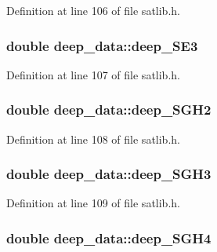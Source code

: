 Definition at line 106 of file satlib.\-h.

\hypertarget{structdeep__data_a51943594c08af647dcc680856232f977}{
\subsubsection[{deep\-\_\-\-S\-E3}]{\setlength{\rightskip}{0pt plus 5cm}double deep\-\_\-data\-::deep\-\_\-\-S\-E3}}\label{structdeep__data_a51943594c08af647dcc680856232f977}


Definition at line 107 of file satlib.\-h.

\hypertarget{structdeep__data_a3dad09351712388de9c2535bd390306e}{
\subsubsection[{deep\-\_\-\-S\-G\-H2}]{\setlength{\rightskip}{0pt plus 5cm}double deep\-\_\-data\-::deep\-\_\-\-S\-G\-H2}}\label{structdeep__data_a3dad09351712388de9c2535bd390306e}


Definition at line 108 of file satlib.\-h.

\hypertarget{structdeep__data_aa2d221ae5138c88af2f6bc6264bad6bb}{
\subsubsection[{deep\-\_\-\-S\-G\-H3}]{\setlength{\rightskip}{0pt plus 5cm}double deep\-\_\-data\-::deep\-\_\-\-S\-G\-H3}}\label{structdeep__data_aa2d221ae5138c88af2f6bc6264bad6bb}


Definition at line 109 of file satlib.\-h.

\hypertarget{structdeep__data_a2995096073c3888a1822bfee3c5f890e}{
\subsubsection[{deep\-\_\-\-S\-G\-H4}]{\setlength{\rightskip}{0pt plus 5cm}double deep\-\_\-data\-::deep\-\_\-\-S\-G\-H4}}\label{structdeep__data_a2995096073c3888a1822bfee3c5f890e}


